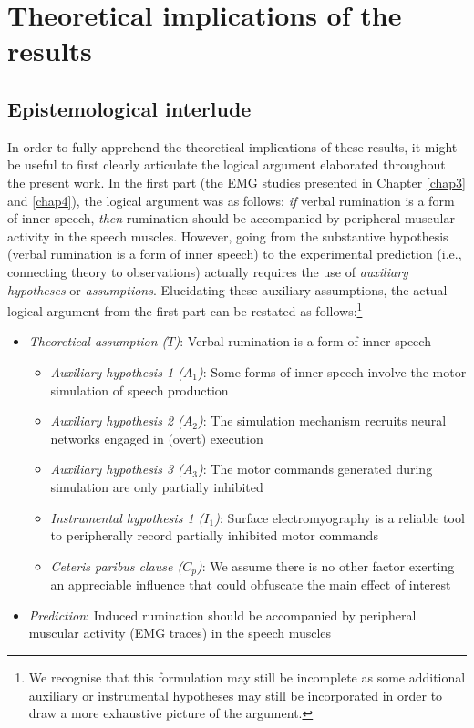 \documentclass[a4paper,12pt,twoside,openright,oldfontcommands,final]{memoir}
\providecommand{\tightlist}{%
  \setlength{\itemsep}{0pt}\setlength{\parskip}{0pt}}
\let\rmarkdownfootnote\footnote%
\def\footnote{\protect\rmarkdownfootnote}
\begin{document}
\hypertarget{theoretical-implications-of-the-results}{%
\section{Theoretical implications of the results}\label{theoretical-implications-of-the-results}}

\hypertarget{epistemological-interlude}{%
\subsection{Epistemological interlude}\label{epistemological-interlude}}

In order to fully apprehend the theoretical implications of these results, it might be useful to first clearly articulate the logical argument elaborated throughout the present work. In the first part (the EMG studies presented in Chapter \ref{chap3} and \ref{chap4}), the logical argument was as follows: \emph{if} verbal rumination is a form of inner speech, \emph{then} rumination should be accompanied by peripheral muscular activity in the speech muscles. However, going from the substantive hypothesis (verbal rumination is a form of inner speech) to the experimental prediction (i.e., connecting theory to observations) actually requires the use of \emph{auxiliary hypotheses} or \emph{assumptions}. Elucidating these auxiliary assumptions, the actual logical argument from the first part can be restated as follows:\footnote{We recognise that this formulation may still be incomplete as some additional auxiliary or instrumental hypotheses may still be incorporated in order to draw a more exhaustive picture of the argument.}

\begin{itemize}
\item
  \emph{Theoretical assumption (\(T\))}: Verbal rumination is a form of inner speech

  \begin{itemize}
  \tightlist
  \item
    \emph{Auxiliary hypothesis 1 (\(A_{1}\))}: Some forms of inner speech involve the motor simulation of speech production
  \item
    \emph{Auxiliary hypothesis 2 (\(A_{2}\))}: The simulation mechanism recruits neural networks engaged in (overt) execution
  \item
    \emph{Auxiliary hypothesis 3 (\(A_{3}\))}: The motor commands generated during simulation are only partially inhibited
  \item
    \emph{Instrumental hypothesis 1 (\(I_{1}\))}: Surface electromyography is a reliable tool to peripherally record partially inhibited motor commands
  \item
    \emph{Ceteris paribus clause (\(C_{p}\))}: We assume there is no other factor exerting an appreciable influence that could obfuscate the main effect of interest
  \end{itemize}
\item
  \emph{Prediction}: Induced rumination should be accompanied by peripheral muscular activity (EMG traces) in the speech muscles
\end{itemize}
\end{document}
